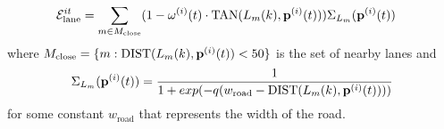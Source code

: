 \documentclass[10pt,twocolumn,letterpaper]{article}
\begin{document}
%   

\begin{align}
  \label{eq:laneOrientationEnergy}
  \mathcal{E}^{it}_{\text{lane}} &= 
  \sum_{m \in M_{\text{close}}}
  (1 - \mathbf{\omega}^{(i)}(t) \cdot \text{TAN}(L_{m}(k), \mathbf{p}^{(i)}(t)) )
\Sigma_{L_m}(\mathbf{p}^{(i)}(t))
\end{align}
where $M_{\text{close}} = \{m : \text{DIST}(L_{m}(k), \mathbf{p}^{(i)}(t)) < 50\} $ is
the set of nearby lanes and 
\begin{align}
\Sigma_{L_m}(\mathbf{p}^{(i)}(t)) = 
  \frac{1}{1 + exp(-q(w_{\text{road}} - \text{DIST}(L_{m}(k), \mathbf{p}^{(i)}(t))))}
\end{align}
for some constant $w_{\text{road}}$ that represents the width of the road.
\end{document}

